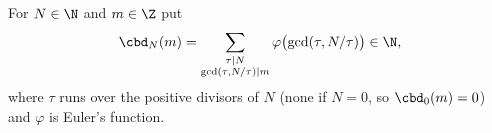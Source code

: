 For $N\in\N$ and $m\in\Z$ put
\[
  \cbd_N(m)=\sum_{\substack{\tau\mid N\\ \gcd(\tau,N/\tau)\mid m}}\varphi\bigl(\gcd(\tau,N/\tau)\bigr)\in\N,
\]
where $\tau$ runs over the positive divisors of $N$ (none if $N=0$, so $\cbd_0(m)=0$) and $\varphi$ is Euler's function.
